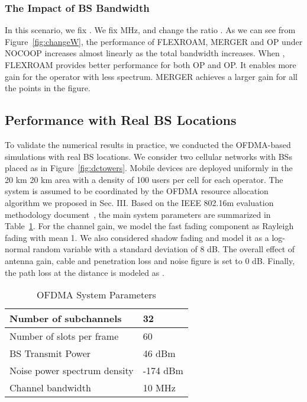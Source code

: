 \documentclass[conference]{IEEEtran}
\begin{document}
\subsubsection{The Impact of BS Bandwidth}

In this scenario, we fix . We fix  MHz, and change the ratio . As we can see from Figure~\ref{fig:changeW}, the performance of FLEXROAM, MERGER and OP under NOCOOP increases almost linearly as the total bandwidth increases. When , FLEXROAM provides better performance for both OP and OP. It enables more gain for the operator with less spectrum. MERGER achieves a larger gain for all the points in the figure.

\subsection{Performance with Real BS Locations}

To validate the numerical results in practice, we conducted the OFDMA-based simulations with real BS locations. We consider two cellular networks with BSs placed as in Figure~\ref{fig:dctowers}. Mobile devices are deployed uniformly in the 20 km  20 km area with a density of 100 users per cell for each operator. The system is assumed to be coordinated by the OFDMA resource allocation algorithm we proposed in Sec. III. Based on the IEEE 802.16m evaluation methodology document~\cite{WiMAXEva}, the main system parameters are summarized in Table~\ref{table:ofdmapara}. For the channel gain, we model the fast fading component as Rayleigh fading with mean 1. We also considered shadow fading and model it as a log-normal random variable with a standard deviation of 8 dB. The overall effect of antenna gain, cable and penetration loss and noise figure is set to 0 dB. Finally, the path loss at the distance  is modeled as .
\begin{table}[!t]
\caption{OFDMA System Parameters}
\label{table:ofdmapara}
\centering
\begin{tabular}{ p{5.5cm} | l }
\hline
Number of subchannels & 32 \\
\hline
Number of slots per frame & 60 \\
\hline
BS Transmit Power & 46 dBm \\
\hline
Noise power spectrum density  & -174 dBm \\
\hline
Channel bandwidth & 10 MHz \\
\hline
\end{tabular}
\vspace{-0.2in}
\end{table}
\end{document}
